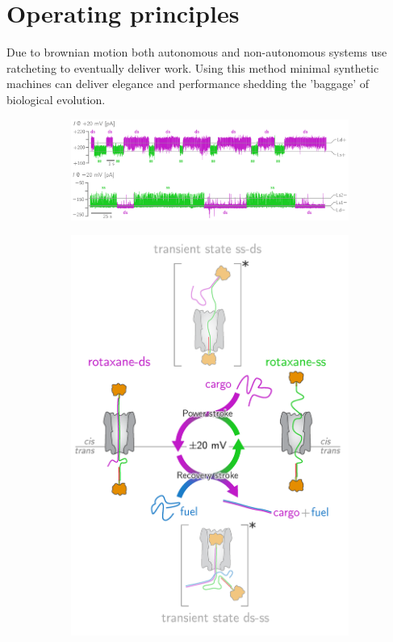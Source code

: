 \section{Operating principles}

Due to brownian motion both autonomous and non-autonomous systems use ratcheting to
eventually deliver work. Using this method minimal synthetic machines can deliver
elegance and performance shedding the 'baggage' of biological evolution.


\begin{figure}[ht]
  \begin{centering}
  \begin{subfigure}[t]{\dimexpr.5\linewidth-1.3em\relax}
  \centering
  \includegraphics[width=.9\linewidth,valign=t]{Figures/FluctuationRotaxane.png}
  \end{subfigure}%
  \vspace{1cm}
  \begin{subfigure}[t]{\dimexpr.5\linewidth-1.3em\relax}
  \centering
  \includegraphics[width=.9\linewidth,valign=t]{Figures/RotaxaneCycle.png}

\end{subfigure}
\end{centering}
\end{figure}
